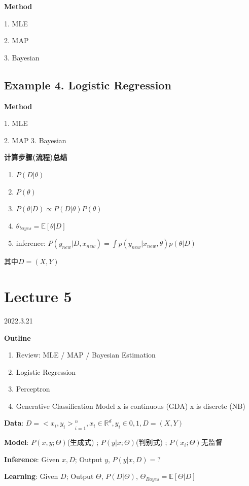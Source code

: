 \documentclass[UTF8]{ctexart}
\numberwithin{equation}{section}
\begin{document}
\textbf{Method}

1. MLE 

2. MAP

3. Bayesian

\subsection{Example 4. Logistic Regression}

\textbf{Method}

1. MLE 

2. MAP
3. Bayesian

\textbf{计算步骤(流程)总结}

\begin{enumerate}
    \item $P(D|\theta)$
    \item $P(\theta)$
    \item $P(\theta|D) \propto P(D | \theta)P(\theta)$
    \item $\theta_{bayes} = \mathbb{E}[\theta | D]$
    \item inference: $P(y_{new}|D,x_{new})=\int p(y_{new}|x_{new}, \theta)p(\theta | D)$
\end{enumerate}
其中$D = (X,Y)$


\newpage

\section{Lecture 5}
2022.3.21


\textbf{Outline}
\begin{enumerate}
    \item Review: MLE / MAP / Bayesian Estimation
    \item Logistic Regression
    \item Perceptron
    \item Generative Classification Model
        \subitem x is continuous (GDA)
        \subitem x is discrete (NB)
\end{enumerate}

\dotfill

\textbf{Data}: $D={<x_i, y_i>}_{i=1}^n, x_i \in \mathbb{R}^d, y_i\in{0,1}, D=(X,Y)$ 

\textbf{Model}: $P(x,y; \Theta)$(生成式) ; $P(y|x; \Theta)$(判别式) ; $P(x_i; \Theta)$无监督

\textbf{Inference}: Given $x, D$; Output $y$, $P(y|x, D)=?$

\textbf{Learning}: Given $D$; Output $\Theta$, $P(D|\Theta)$, $\Theta_{Bayes}=\mathbb{E}[\Theta|D]$
\end{document}
